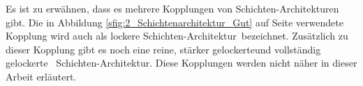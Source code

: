 Es ist zu erwähnen, dass es mehrere Kopplungen von Schichten-Architekturen gibt. Die in Abbildung \ref{sfig:2_Schichtenarchitektur_Gut} auf Seite \pageref{sfig:2_Schichtenarchitektur_Gut} verwendete Kopplung wird auch als \glqq lockere Schichten-Architektur\grqq\ bezeichnet. Zusätzlich zu dieser Kopplung gibt es noch eine \glqq reine\grqq , \glqq stärker gelockerte\grqq und \glqq vollständig gelockerte \grqq\ Schichten-Architektur. Diese Kopplungen werden nicht näher in dieser Arbeit erläutert.